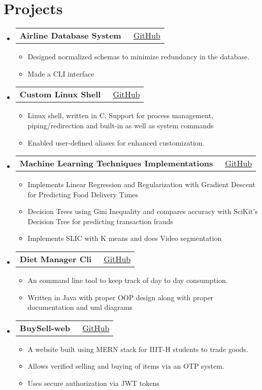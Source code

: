 \documentclass[a4paper,10pt]{article}
\makeatletter
\newcommand{\resumeItem}[1]{\item[\textcolor{bulletcolor}{\textbullet}] \small{#1}}
\newcommand{\resumeProjectHeading}[2]{
    \item
    \begin{tabular*}{0.97\textwidth}{l@{\extracolsep{\fill}}r}
        \textbf{#1} & {\small #2} \\
    \end{tabular*}\vspace{-7pt}
}
\makeatother
\begin{document}
\section{Projects}
\begin{itemize}[leftmargin=0.15in, label={}]
    \resumeProjectHeading
        {\textbf{Airline Database System}}{{\small\faGithub}\ \href{https://github.com/mayank3135432/Airline_Database_System}{GitHub}}
        \begin{itemize}[leftmargin=0.15in]
            \resumeItem{Designed normalized schemas to minimize redundancy in the database.}
            \resumeItem{Made a CLI interface}
        \end{itemize}
        
    \resumeProjectHeading
        {\textbf{Custom Linux Shell}}{{\small\faGithub}\ \href{https://github.com/mayank3135432/osn-mp1}{GitHub}}
        \begin{itemize}[leftmargin=0.15in]
            \resumeItem{Linux shell, written in C. Support for process management, piping/redirection and built-in as well as system commands}
            \resumeItem{Enabled user-defined aliases for enhanced customization.}
        \end{itemize}
        
    \resumeProjectHeading
        {\textbf{Machine Learning Techniques Implementations}}{{\small\faGithub}\ \href{https://github.com/mayank3135432/SMAI-Assignment-1}{GitHub}}
        \begin{itemize}[leftmargin=0.15in]
            \resumeItem{Implements Linear Regression and Regularization with Gradient Descent for Predicting Food Delivery Times}
            \resumeItem{Decision Trees using Gini Inequality and compares accuracy with SciKit's Decision Tree for predicting transaction frauds}
            \resumeItem{Implements SLIC with K means and does Video segmentation}
        \end{itemize}
        
    \resumeProjectHeading
        {\textbf{Diet Manager Cli}}{{\small\faGithub}\ \href{https://github.com/mayank3135432/diet_manager-cli}{GitHub}}
        \begin{itemize}[leftmargin=0.15in]
            \resumeItem{An command line tool to keep track of day to day consumption.}
            \resumeItem{Written in Java with proper OOP design along with proper documentation and uml diagrams}
        \end{itemize}
        
    \resumeProjectHeading
        {\textbf{BuySell-web}}{{\small\faGithub}\ \href{https://github.com/mayank3135432/BUYSELL-web}{GitHub}}
        \begin{itemize}[leftmargin=0.15in]
            \resumeItem{A website built using MERN stack for IIIT-H students to trade goods.}
            \resumeItem{Allows verified selling and buying of items via an OTP system.}
            \resumeItem{Uses secure authorization via JWT tokens}
        \end{itemize}


\end{itemize}
\end{document}
